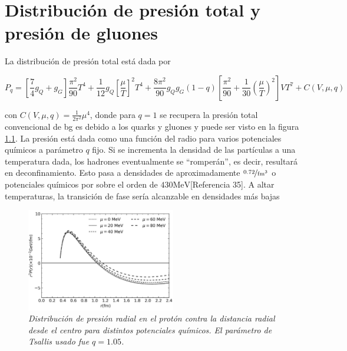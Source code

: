 \chapter{Distribución de presión total y presión de gluones}

La distribución de presión total está dada por 

\begin{equation}
{P}_{q} =\left[\frac{7}{4}{g}_{Q} + {g}_{G} \right] \frac{{\pi}^{2}}{90}{T}^{4} + \frac{1}{12} {g}_{Q} \left[\frac{\mu}{T} \right]^{2} {T}^{4} + \frac{8{\pi}^{2}}{90} {g}_{Q}{g}_{G} \left(1-q\right) \left[\frac{{\pi}^{2}}{90} + \frac{1}{30} \left(\frac{\mu}{T} \right)^{2} \right]V{T}^{7} + C \left(V,\mu,q \right)
\end{equation}

con $C(V,\mu,q) = \frac{1}{2{\pi}^{2}}{\mu}^{4}$, donde para $q=1$ se recupera la presión total convencional de \acrshort{bg} es debido a los quarks y gluones y puede ser visto en la figura \ref{fig: Presión total en T-MIT bag model}. La presión está dada como una función del radio para varios potenciales químicos a parámetro $q$ fijo. Si se incrementa la densidad de las partículas a una temperatura dada, los hadrones eventualmente se ``romperán'', es decir, resultará en deconfinamiento. Esto pasa a densidades de aproximadamente $\nicefrac{0.72}{\mathrm{\unit{\femto\meter}}^{3}}$ o potenciales químicos por sobre el orden de $430 \mathrm{MeV}$[Referencia 35]. A altar temperaturas, la transición de fase sería alcanzable en densidades más bajas

\begin{figure}
\centering
\includegraphics[width=0.58\textwidth]{./Images/TotalPressureTsallis.png}
\caption[Presión total en el modelo T-MIT bag model]{\emph{Distribución de presión radial en el protón  contra la distancia radial desde el centro para distintos potenciales químicos. El parámetro de Tsallis usado fue $q=1.05$.}}
\label{fig: Presión total en T-MIT bag model}
\end{figure}

